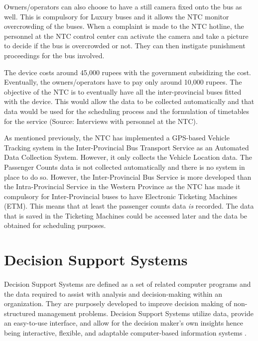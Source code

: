 Owners/operators can also choose to have a still camera fixed onto the bus as well. This is compulsory for Luxury buses and it allows the NTC monitor overcrowding of the buses. When a complaint is made to the NTC hotline, the personnel at the NTC control center can activate the camera and take a picture to decide if the bus is overcrowded or not. They can then instigate punishment proceedings for the bus involved.

The device costs around 45,000 rupees with the government subsidizing the cost. Eventually, the owners/operators have to pay only around 10,000 rupees. The objective of the NTC is to eventually have all the inter-provincial buses fitted with the device. This would allow the data to be collected automatically and that data would be used for the scheduling process and the formulation of timetables for the service (Source: Interviews with personnel at the NTC).

As mentioned previously, the NTC has implemented a GPS-based Vehicle Tracking system in the Inter-Provincial Bus Transport Service as an Automated Data Collection System. However, it only collects the Vehicle Location data. The Passenger Counts data is not collected automatically and there is no system in place to do so. However, the Inter-Provincial Bus Service is more developed than the Intra-Provincial Service in the Western Province as the NTC has made it compulsory for Inter-Provincial buses to have Electronic Ticketing Machines (ETM). This means that at least the passenger counts data \textit{is} recorded. The data that is saved in the Ticketing Machines could be accessed later and the data be obtained for scheduling purposes.

\section{Decision Support Systems}
\label {section-DSS}

\paragraph{ } Decision Support Systems are defined as a set of related computer programs and the data required to assist with analysis and decision-making within an organization. They are purposely developed to improve decision making of non-structured management problems. Decision Support Systems utilize data, provide an easy-to-use interface, and allow for the decision maker’s own insights hence being interactive, flexible, and adaptable computer-based information systems \cite{Turban2005}. 

